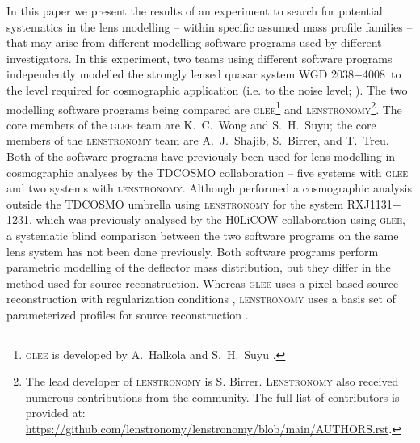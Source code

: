 \documentclass[longauth]{aa}
\newcommand{\lensname}{WGD 2038$-$4008}
\newcommand{\ajs}[1]{{{#1}}}
\begin{document}
In this paper we present the results of an experiment to search for potential systematics in the lens modelling -- within specific assumed mass profile families -- that may arise from different modelling \ajs{software programs} used by different investigators. In this experiment, two teams using different \ajs{software programs} independently modelled the strongly lensed quasar system \lensname\ to the level required for cosmographic application (i.e. to the noise level; \citealt{Agnello18c}). The two modelling \ajs{software programs} being compared are \textsc{glee}\footnote{\textsc{glee} is developed by A.~Halkola and S.~H.~Suyu \citep{Suyu10b,Suyu12b}.} and \textsc{lenstronomy}\footnote{The lead developer of \textsc{lenstronomy} is S. Birrer. \textsc{Lenstronomy} also received numerous contributions from the community. The full list of contributors is provided at: \url{https://github.com/lenstronomy/lenstronomy/blob/main/AUTHORS.rst}.}. The core members of the \textsc{glee} team are K.~C.~Wong and S.~H.~Suyu; the core members of the \textsc{lenstronomy} team are A.~J.~Shajib, S.~Birrer, and T.~Treu. Both of the \ajs{software programs} have previously been used for lens modelling in cosmographic analyses by the TDCOSMO collaboration  -- five systems with \textsc{glee} and two systems with \textsc{lenstronomy}. Although \citet{Birrer16} performed a cosmographic analysis outside the TDCOSMO umbrella using \textsc{lenstronomy} for the system RXJ1131$-$1231, which was previously analysed by the H0LiCOW collaboration using \textsc{glee}, a systematic blind comparison between the two \ajs{software programs} on the same lens system has not been \ajs{done previously}. Both \ajs{software programs} perform parametric modelling of the deflector mass distribution, but they differ in the method used for source reconstruction. Whereas \textsc{glee} uses a pixel-based source reconstruction with regularization conditions \citep{Suyu06}, \textsc{lenstronomy} uses a basis set of parameterized profiles for source reconstruction \citep{Birrer15, Birrer18, Birrer21b}.
\end{document}

